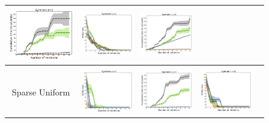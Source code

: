 \documentclass{article}
\renewcommand\[{\begin{equation}}
\renewcommand\]{\end{equation}}
\begin{document}
\begin{figure}[t]
{\begin{tabular}{ccccc}
        \includegraphics[align=c,width=10em]{figures/synthetic_vs_others_3_normal_per_iter_time} &
        \includegraphics[align=c,width=10em]{figures/synthetic_vs_others_4_normal_per_iter_loss} &
        \includegraphics[align=c,width=10em]{figures/synthetic_vs_others_4_normal_per_iter_time}
        \\
        \hline
        \\
        {\sc Sparse Uniform} &
        \includegraphics[align=c,width=10em]{figures/synthetic_vs_others_3_uniform_sparse_per_iter_loss} &
        \includegraphics[align=c,width=10em]{figures/synthetic_vs_others_3_uniform_sparse_per_iter_time} &
        \includegraphics[align=c,width=10em]{figures/synthetic_vs_others_4_uniform_sparse_per_iter_loss} &

\end{tabular}}
\end{figure}
\end{document}
